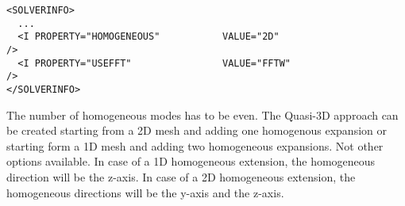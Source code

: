 \begin{lstlisting}[style=XMLStyle]
<SOLVERINFO>
  ...
  <I PROPERTY="HOMOGENEOUS"           VALUE="2D"                         />
  <I PROPERTY="USEFFT"                VALUE="FFTW"                       />
</SOLVERINFO>
\end{lstlisting}

The number of homogeneous modes has to be even. The Quasi-3D approach can be
created starting from a 2D mesh and adding one homogenous expansion or starting
form a 1D mesh and adding two homogeneous expansions. Not other options
available. In case of a 1D homogeneous extension, the homogeneous direction will
be the z-axis. In case of a 2D homogeneous extension, the homogeneous directions
will be the y-axis and the z-axis.

